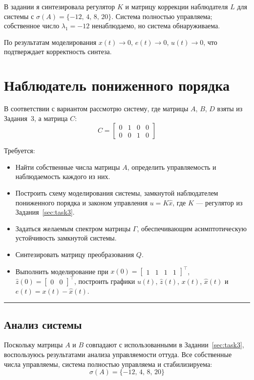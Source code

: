 \documentclass[a4paper,12pt]{article}
\begin{document}
В задании я синтезировала регулятор $K$ и матрицу коррекции наблюдателя
$L$ для системы с $\sigma(A) = \{-12,\, 4,\, 8,\, 20\}$.
Система полностью управляема; собственное число $\lambda_1 = -12$
ненаблюдаемо, но система обнаруживаема.

По результатам моделирования $x(t) \to 0$, $e(t) \to 0$, $u(t) \to 0$,
что подтверждает корректность синтеза.




\newpage
\section{Наблюдатель пониженного порядка}
\label{sec:task4}


В соответствии с вариантом рассмотрю систему, где матрицы $A$,
$B$, $D$ взяты из Задания~3, а матрица $C$:
\[
C = \begin{bmatrix}
	0 & 1 & 0 & 0 \\
	0 & 0 & 1 & 0
\end{bmatrix}
\]

Требуется:
\begin{itemize}
	\item Найти собственные числа матрицы $A$, определить управляемость
	и наблюдаемость каждого из них.
	\item Построить схему моделирования системы, замкнутой наблюдателем
	пониженного порядка и законом управления $u = K\hat{x}$,
	где $K$ --- регулятор из Задания~\ref{sec:task3}.
	\item Задаться желаемым спектром матрицы $\Gamma$, обеспечивающим
	асимптотическую устойчивость замкнутой системы.
	\item Синтезировать матрицу преобразования $Q$.
	\item Выполнить моделирование при $x(0) = \begin{bmatrix}1&1&1&1
	\end{bmatrix}^{\top}$, $\hat{z}(0) = \begin{bmatrix}0&0
	\end{bmatrix}^{\top}$, построить графики $u(t)$, $\hat{z}(t)$,
	$x(t)$, $\hat{x}(t)$ и $e(t) = x(t) - \hat{x}(t)$.
\end{itemize}

\hrule \newpage


\subsection{Анализ системы}

Поскольку матрицы $A$ и $B$ совпадают с использованными в Задании~\ref{sec:task3},
воспользуюсь результатами анализа управляемости оттуда.
Все собственные числа управляемы, система полностью управляема и стабилизируема:
$$\sigma(A) = \{-12,\, 4,\, 8,\, 20\}$$
\end{document}
